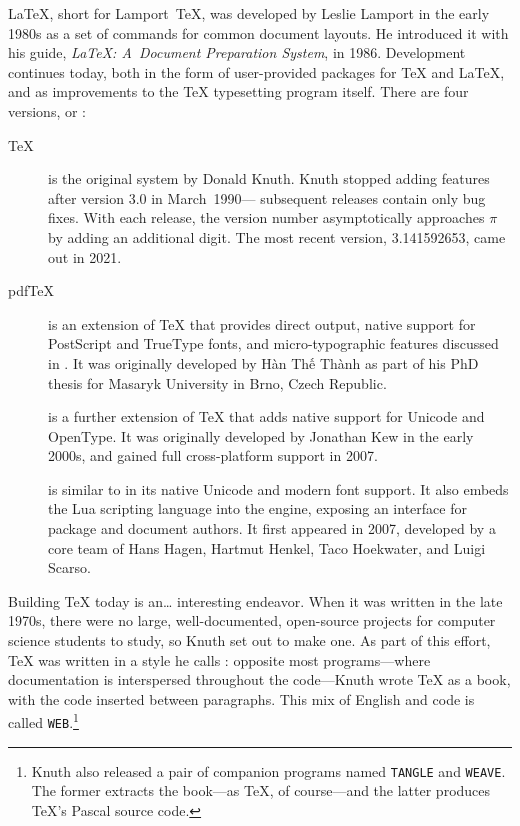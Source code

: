 \LaTeX{}, short for Lamport~\TeX{}, was developed by Leslie Lamport in the
early 1980s as a set of commands for common document layouts.
He introduced it with his guide,
\textit{\LaTeX: A~Document Preparation System},
in 1986.
Development continues today,
both in the form of user-provided packages for \TeX{} and \LaTeX{},
and as improvements to the \TeX{} typesetting program itself.
There are four versions, or :
\begin{description}
\item[\TeX] is the original system by Donald Knuth.
Knuth stopped adding features after version 3.0 in March~1990---%
subsequent releases contain only bug fixes.
With each release, the version number asymptotically approaches $\pi$
by adding an additional digit.
The most recent version, 3.141592653, came out in 2021.

\item[pdf\TeX] is an extension of \TeX{} that provides direct 
    output,
    native support for PostScript
    and TrueType fonts,
    and micro-typographic features discussed in .
    It was originally developed by
    Hàn Thế Thành
    as part of his PhD thesis
    for Masaryk University in Brno, Czech Republic.\punckern{}

\item[\XeTeX] is a further extension of \TeX{} that adds native support for
    Unicode and OpenType.
    It was originally developed by Jonathan Kew in the early 2000s,
    and gained full cross-platform support in 2007.\punckern{}

\item[\LuaTeX] is similar to \XeTeX{} in its native Unicode and modern font support.
    It also embeds the Lua scripting language into the engine,
    exposing an interface for package and document authors.
    It first appeared in 2007, developed by a core team of
    Hans Hagen, Hartmut Henkel, Taco Hoekwater,
    and Luigi Scarso.\punckern{}
\end{description}

Building \TeX{} today is an\dots{} interesting endeavor.
When it was written in the late 1970s,
there were no large, well-documented, open-source projects for computer science
students to study,
so Knuth set out to make one.
As part of this effort, \TeX{} was written in a style he calls
: opposite most programs---where
documentation is interspersed throughout the code---Knuth wrote \TeX{} as a book,
with the code inserted between paragraphs.
This mix of English and code is called \texttt{WEB}.\punckern\footnote{Knuth
also released a pair of companion programs named
\texttt{TANGLE} and \texttt{WEAVE}.
The former extracts the book---as \TeX, of course---and the latter
produces \TeX's Pascal source code.}

